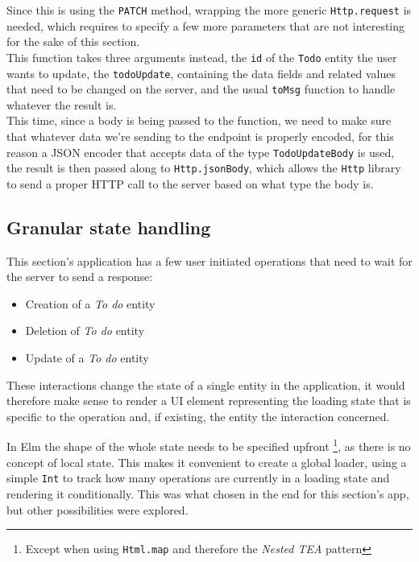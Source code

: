 \begin{sloppypar}
Since this is using the \texttt{PATCH} method, wrapping the more generic \texttt{Http.request} is needed, which requires to specify a few more parameters that are not interesting for the sake of this section.\\
This function takes three arguments instead, the \texttt{id} of the \texttt{Todo} entity the user wants to update, the \texttt{todoUpdate}, containing the data fields and related values that need to be changed on the server, and the usual \texttt{toMsg} function to handle whatever the result is.\\
This time, since a body is being passed to the function, we need to make sure that whatever data we're sending to the endpoint is properly encoded, for this reason a JSON encoder that accepts data of the type \texttt{TodoUpdateBody} is used, the result is then passed along to \texttt{Http.jsonBody}, which allows the \texttt{Http} library to send a proper HTTP call to the server based on what type the body is.
\end{sloppypar}

\subsection{Granular state handling}
This section's application has a few user initiated operations that need to wait for the server to send a response:
\begin{itemize}
    \item Creation of a \textit{To do} entity
    \item Deletion of \textit{To do} entity
    \item Update of a \textit{To do} entity
\end{itemize}
These interactions change the state of a single entity in the application, it would therefore make sense to render a UI element representing the loading state that is specific to the operation and, if existing, the entity the interaction concerned.

In Elm the shape of the whole state needs to be specified upfront \footnote{Except when using \texttt{Html.map} and therefore the \textit{Nested TEA} pattern}\cite{noauthor_elm_nodate}, as there is no concept of local state. This makes it convenient to create a global loader, using a simple \texttt{Int} to track how many operations are currently in a loading state and rendering it conditionally. This was what chosen in the end for this section's app, but other possibilities were explored.\\

